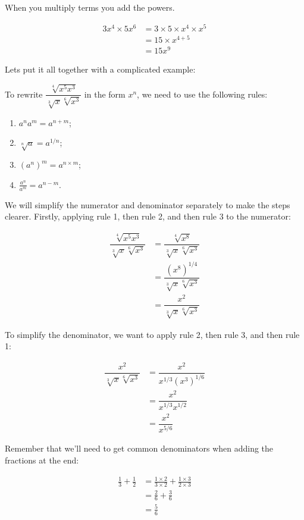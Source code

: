 \documentclass[
  a4paper,
]{scrbook}
\providecommand{\tightlist}{%
  \setlength{\itemsep}{0pt}\setlength{\parskip}{0pt}}\usepackage{longtable,booktabs,array}
\begin{document}
When you multiply terms you add the powers.

\[
\begin{aligned} 3x^4 \times 5x^6 &= 3 \times 5 \times x^4 \times x^5 \\
&= 15 \times x^{4+5} \\
&= 15x^9
\end{aligned}
\]

Lets put it all together with a complicated example:

To rewrite \(\dfrac{\sqrt[4]{x^5x^3}}{\sqrt[3]{x} \sqrt[6]{x^3}}\) in
the form \(x^n\), we need to use the following rules:

\begin{enumerate}
\def\labelenumi{\arabic{enumi}.}
\tightlist
\item
  \(a^n a^m = a^{n+m}\);
\item
  \(\sqrt[n]{a} = a^{1/n}\);
\item
  \(\left(a^n\right)^m = a^{n \times m}\);
\item
  \(\frac{a^n}{a^m} = a^{n-m}\).
\end{enumerate}

We will simplify the numerator and denominator separately to make the
steps clearer. Firstly, applying rule 1, then rule 2, and then rule 3 to
the numerator:

\[
\begin{aligned} \dfrac{\sqrt[4]{x^5x^3}}{\sqrt[3]{x} \sqrt[6]{x^3}} &= \dfrac{\sqrt[4]{x^8}}{\sqrt[3]{x} \sqrt[6]{x^3}} \\
 &= \dfrac{(x^8)^{1/4}}{\sqrt[3]{x} \sqrt[6]{x^3}} \\
 &= \dfrac{x^2}{\sqrt[3]{x} \sqrt[6]{x^3}}
\end{aligned}
\]

To simplify the denominator, we want to apply rule 2, then rule 3, and
then rule 1:

\[
\begin{aligned} \dfrac{x^2}{\sqrt[3]{x} \sqrt[6]{x^3}} &= \dfrac{x^2}{x^{1/3} (x^3)^{1/6}} \\
 &= \dfrac{x^2}{x^{1/3} x^{1/2}} \\
 &= \dfrac{x^2}{x^{5/6}}
\end{aligned}
\]

Remember that we'll need to get common denominators when adding the
fractions at the end:

\[
\begin{aligned} \frac{1}{3} + \frac{1}{2} &= \frac{1\times2}{3\times2}  + \frac{1\times3}{2\times3} \\
&= \frac{2}{6}  + \frac{3}{6} \\
&= \frac{5}{6}
\end{aligned}
\]
\end{document}
